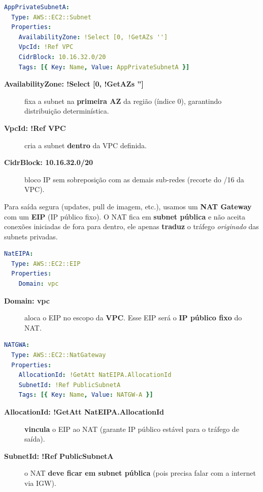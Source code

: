 \begin{lstlisting}[language=YAML,float=htbp,label={lst:subnet-priv-a}]
AppPrivateSubnetA:
  Type: AWS::EC2::Subnet
  Properties:
    AvailabilityZone: !Select [0, !GetAZs '']
    VpcId: !Ref VPC
    CidrBlock: 10.16.32.0/20
    Tags: [{ Key: Name, Value: AppPrivateSubnetA }]
\end{lstlisting}

\begin{description}
  \item[\textbf{AvailabilityZone: !Select [0, !GetAZs '']}] fixa a subnet na \textbf{primeira AZ} da região (índice 0), garantindo distribuição determinística.
  \item[\textbf{VpcId: !Ref VPC}] cria a subnet \textbf{dentro} da VPC definida.
  \item[\textbf{CidrBlock: 10.16.32.0/20}] bloco IP sem sobreposição com as demais sub-redes (recorte do /16 da VPC).
\end{description}

Para saída segura (updates, pull de imagem, etc.), usamos um \textbf{NAT Gateway} com um \textbf{EIP} (IP público fixo). O NAT fica em \textbf{subnet pública} e não aceita conexões iniciadas de fora para dentro, ele apenas \textbf{traduz} o tráfego \emph{originado} das subnets privadas.

\begin{lstlisting}[language=YAML, float=htbp]
NatEIPA:
  Type: AWS::EC2::EIP
  Properties:
    Domain: vpc
\end{lstlisting}

\begin{description}
  \item[\textbf{Domain: vpc}] aloca o EIP no escopo da \textbf{VPC}. Esse EIP será o \textbf{IP público fixo} do NAT.
\end{description}

\begin{lstlisting}[language=YAML, float=htbp]
NATGWA:
  Type: AWS::EC2::NatGateway
  Properties:
    AllocationId: !GetAtt NatEIPA.AllocationId
    SubnetId: !Ref PublicSubnetA
    Tags: [{ Key: Name, Value: NATGW-A }]
\end{lstlisting}

\begin{description}
  \item[\textbf{AllocationId: !GetAtt NatEIPA.AllocationId}] \textbf{vincula} o EIP ao NAT (garante IP público estável para o tráfego de saída).
  \item[\textbf{SubnetId: !Ref PublicSubnetA}] o NAT \textbf{deve ficar em subnet pública} (pois precisa falar com a internet via IGW).
\end{description}

